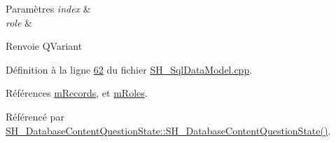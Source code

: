 \begin{DoxyParams}{Paramètres}
{\em index} & \\
\hline
{\em role} & \\
\hline
\end{DoxyParams}
\begin{DoxyReturn}{Renvoie}
Q\-Variant 
\end{DoxyReturn}


Définition à la ligne \hyperlink{SH__SqlDataModel_8cpp_source_l00062}{62} du fichier \hyperlink{SH__SqlDataModel_8cpp_source}{S\-H\-\_\-\-Sql\-Data\-Model.\-cpp}.



Références \hyperlink{classSH__SqlDataModel_aa58096989daac3cd3fdea5e6dd4f27ee}{m\-Records}, et \hyperlink{classSH__SqlDataModel_ad1e46c72a6aeb83e3e7bb0c3110d12a4}{m\-Roles}.



Référencé par \hyperlink{classSH__DatabaseContentQuestionState_ab26490ea519262a8f9ca72c000bf7313}{S\-H\-\_\-\-Database\-Content\-Question\-State\-::\-S\-H\-\_\-\-Database\-Content\-Question\-State()}.


